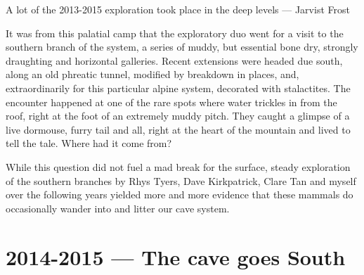 \begin{marginfigure}
	\checkoddpage \ifoddpage \forcerectofloat \else \forceversofloat \fi
	\centering	{} 
  	\caption{A lot of the 2013-2015 exploration took place in the deep \protect{} levels --- Jarvist Frost}
	\end{marginfigure}

It was from this palatial camp that the exploratory duo went for a visit to the southern branch of the system, a series of muddy, but essential bone dry, strongly draughting and horizontal galleries. Recent extensions were headed due south, along an old phreatic tunnel, modified by breakdown in places, and, extraordinarily for this particular alpine system, decorated with stalactites. The encounter happened at one of the rare spots where water trickles in from the roof, right at the foot of an extremely muddy pitch. They caught a glimpse of a live dormouse, furry tail and all, right at the heart of the mountain and lived to tell the tale. Where had it come from? 

While this question did not fuel a mad break for the surface, steady exploration of the southern branches by Rhys Tyers, Dave Kirkpatrick, Clare Tan and myself over the following years yielded more and more evidence that these mammals do occasionally wander into and litter our cave system.

\section{2014-2015 --- The cave goes South}

